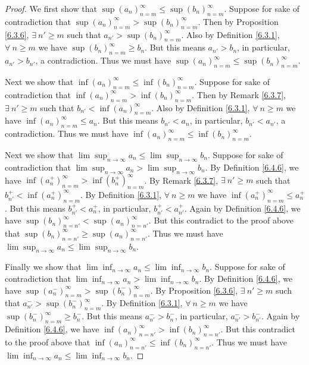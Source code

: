 \begin{proof}
    We first show that \(\sup(a_n)_{n = m}^\infty \leq \sup(b_n)_{n = m}^\infty\).
    Suppose for sake of contradiction that \(\sup(a_n)_{n = m}^\infty > \sup(b_n)_{n = m}^\infty\).
    Then by Proposition \ref{6.3.6}, \(\exists\ n' \geq m\) such that \(a_{n'} > \sup(b_n)_{n = m}^\infty\).
    Also by Definition \ref{6.3.1}, \(\forall\ n \geq m\) we have \(\sup(b_n)_{n = m}^\infty \geq b_n\).
    But this means \(a_{n'} > b_n\), in particular, \(a_{n'} > b_{n'}\), a contradiction.
    Thus we must have \(\sup(a_n)_{n = m}^\infty \leq \sup(b_n)_{n = m}^\infty\).

    Next we show that \(\inf(a_n)_{n = m}^\infty \leq \inf(b_n)_{n = m}^\infty\).
    Suppose for sake of contradiction that \(\inf(a_n)_{n = m}^\infty > \inf(b_n)_{n = m}^\infty\).
    Then by Remark \ref{6.3.7}, \(\exists\ n' \geq m\) such that \(b_{n'} < \inf(a_n)_{n = m}^\infty\).
    Also by Definition \ref{6.3.1}, \(\forall\ n \geq m\) we have \(\inf(a_n)_{n = m}^\infty \leq a_n\).
    But this means \(b_{n'} < a_n\), in particular, \(b_{n'} < a_{n'}\), a contradiction.
    Thus we must have \(\inf(a_n)_{n = m}^\infty \leq \inf(b_n)_{n = m}^\infty\).

    Next we show that \(\lim\sup_{n \to \infty} a_n \leq \lim\sup_{n \to \infty} b_n\).
    Suppose for sake of contradiction that \(\lim\sup_{n \to \infty} a_n > \lim\sup_{n \to \infty} b_n\).
    By Definition \ref{6.4.6}, we have \(\inf(a_n^+)_{n = m}^\infty > \inf(b_n^+)_{n = m}^\infty\).
    By Remark \ref{6.3.7}, \(\exists\ n' \geq m\) such that \(b_{n'}^+ < \inf(a_n^+)_{n = m}^\infty\).
    By Definition \ref{6.3.1}, \(\forall\ n \geq m\) we have \(\inf(a_n^+)_{n = m}^\infty \leq a_n^+\).
    But this means \(b_{n'}^+ < a_n^+\), in particular, \(b_{n'}^+ < a_{n'}^+\).
    Again by Definition \ref{6.4.6}, we have \(\sup(b_n)_{n = n'}^\infty < \sup(a_n)_{n = n'}^\infty\).
    But this contradict to the proof above that \(\sup(b_n)_{n = n'}^\infty \geq \sup(a_n)_{n = n'}^\infty\).
    Thus we must have \(\lim\sup_{n \to \infty} a_n \leq \lim\sup_{n \to \infty} b_n\).

    Finally we show that \(\lim\inf_{n \to \infty} a_n \leq \lim\inf_{n \to \infty} b_n\).
    Suppose for sake of contradiction that \(\lim\inf_{n \to \infty} a_n > \lim\inf_{n \to \infty} b_n\).
    By Definition \ref{6.4.6}, we have \(\sup(a_n^-)_{n = m}^\infty > \sup(b_n^-)_{n = m}^\infty\).
    By Proposition \ref{6.3.6}, \(\exists\ n' \geq m\) such that \(a_{n'}^- > \sup(b_n^-)_{n = m}^\infty\).
    By Definition \ref{6.3.1}, \(\forall\ n \geq m\) we have \(\sup(b_n^-)_{n = m}^\infty \geq b_n^-\).
    But this means \(a_{n'}^- > b_n^-\), in particular, \(a_{n'}^- > b_{n'}^-\).
    Again by Definition \ref{6.4.6}, we have \(\inf(a_n)_{n = n'}^\infty > \inf(b_n)_{n = n'}^\infty\).
    But this contradict to the proof above that \(\inf(a_n)_{n = n'}^\infty \leq \inf(b_n)_{n = n'}^\infty\).
    Thus we must have \(\lim\inf_{n \to \infty} a_n \leq \lim\inf_{n \to \infty} b_n\).
\end{proof}

